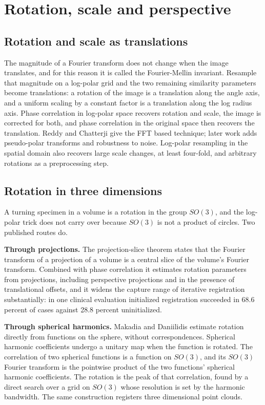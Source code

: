 \chapter{Rotation, scale and perspective}

\section{Rotation and scale as translations}

The magnitude of a Fourier transform does not change when the image translates, and for this reason it
is called the Fourier-Mellin invariant. Resample that magnitude on a log-polar grid and the two
remaining similarity parameters become translations: a rotation of the image is a translation
along the angle axis, and a uniform scaling by a constant factor is a translation along the log
radius axis. Phase correlation in log-polar space recovers rotation and scale, the image is corrected
for both, and phase correlation in the original space then recovers the translation. Reddy and
Chatterji give the FFT based technique; later work adds pseudo-polar transforms and robustness
to noise. Log-polar resampling in the spatial domain also recovers large scale changes, at least
four-fold, and arbitrary rotations as a preprocessing step.

\section{Rotation in three dimensions}

A turning specimen in a volume is a rotation in the group \(SO(3)\), and the log-polar trick does not
carry over because \(SO(3)\) is not a product of circles. Two published routes do.

\textbf{Through projections.} The projection-slice theorem states that the Fourier transform of a
projection of a volume is a central slice of the volume's Fourier transform. Combined with phase
correlation it estimates rotation parameters from projections, including perspective projections
and in the presence of translational offsets, and it widens the capture range of iterative
registration substantially: in one clinical evaluation initialized registration succeeded in 68.6
percent of cases against 28.8 percent uninitialized.

\textbf{Through spherical harmonics.} Makadia and Daniilidis estimate rotation directly from
functions on the sphere, without correspondences. Spherical harmonic coefficients undergo a unitary
map when the function is rotated. The correlation of two spherical functions is a function on
\(SO(3)\), and its \(SO(3)\) Fourier transform is the pointwise product of the two functions' spherical
harmonic coefficients. The rotation is the peak of that correlation, found by a direct search over a
grid on \(SO(3)\) whose resolution is set by the harmonic bandwidth. The same construction registers
three dimensional point clouds.


